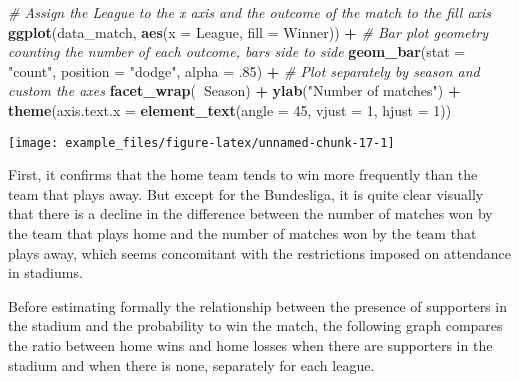 \documentclass[
]{article}
\newenvironment{Shaded}{\begin{snugshade}}{\end{snugshade}}
\newcommand{\CommentTok}[1]{\textcolor[rgb]{0.56,0.35,0.01}{\textit{#1}}}
\newcommand{\DataTypeTok}[1]{\textcolor[rgb]{0.13,0.29,0.53}{#1}}
\newcommand{\DecValTok}[1]{\textcolor[rgb]{0.00,0.00,0.81}{#1}}
\newcommand{\FloatTok}[1]{\textcolor[rgb]{0.00,0.00,0.81}{#1}}
\newcommand{\KeywordTok}[1]{\textcolor[rgb]{0.13,0.29,0.53}{\textbf{#1}}}
\newcommand{\NormalTok}[1]{#1}
\newcommand{\OperatorTok}[1]{\textcolor[rgb]{0.81,0.36,0.00}{\textbf{#1}}}
\newcommand{\StringTok}[1]{\textcolor[rgb]{0.31,0.60,0.02}{#1}}
\begin{document}
\begin{Shaded}
\begin{Highlighting}[]
\CommentTok{# Assign the League to the x axis and the outcome of the match to the fill axis}
\KeywordTok{ggplot}\NormalTok{(data_match, }\KeywordTok{aes}\NormalTok{(}\DataTypeTok{x =}\NormalTok{ League, }\DataTypeTok{fill =}\NormalTok{ Winner)) }\OperatorTok{+}
\StringTok{  }\CommentTok{# Bar plot geometry counting the number of each outcome, bars side to side}
\StringTok{  }\KeywordTok{geom_bar}\NormalTok{(}\DataTypeTok{stat =} \StringTok{"count"}\NormalTok{, }\DataTypeTok{position =} \StringTok{"dodge"}\NormalTok{, }\DataTypeTok{alpha =} \FloatTok{.85}\NormalTok{) }\OperatorTok{+}\StringTok{ }
\StringTok{  }\CommentTok{# Plot separately by season and custom the axes}
\StringTok{  }\KeywordTok{facet_wrap}\NormalTok{(}\OperatorTok{~}\NormalTok{Season) }\OperatorTok{+}\StringTok{ }\KeywordTok{ylab}\NormalTok{(}\StringTok{"Number of matches"}\NormalTok{) }\OperatorTok{+}\StringTok{ }
\StringTok{  }\KeywordTok{theme}\NormalTok{(}\DataTypeTok{axis.text.x =} \KeywordTok{element_text}\NormalTok{(}\DataTypeTok{angle =} \DecValTok{45}\NormalTok{, }\DataTypeTok{vjust =} \DecValTok{1}\NormalTok{, }\DataTypeTok{hjust =} \DecValTok{1}\NormalTok{)) }
\end{Highlighting}
\end{Shaded}

\begin{center}\texttt{[image: example\_files/figure-latex/unnamed-chunk-17-1]} \end{center}

First, it confirms that the home team tends to win more frequently than
the team that plays away. But except for the Bundesliga, it is quite
clear visually that there is a decline in the difference between the
number of matches won by the team that plays home and the number of
matches won by the team that plays away, which seems concomitant with
the restrictions imposed on attendance in stadiums.

Before estimating formally the relationship between the presence of
supporters in the stadium and the probability to win the match, the
following graph compares the ratio between home wins and home losses
when there are supporters in the stadium and when there is none,
separately for each league.
\end{document}
